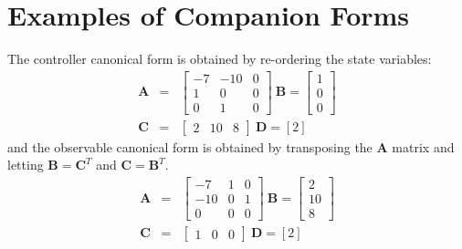 \begin{slide}
\label{slide:l5s} 
\end{slide}

\section*{Examples of Companion Forms}
\ifslidesonly
\begin{slide}

\end{slide}
\fi

The controller canonical form is obtained by re-ordering the state
variables:
\begin{eqnarray*}\mathbf{A} & = & \left[\begin{array}{ccc}
  -7 & -10 & 0 \\
  1 & 0 & 0 \\
  0 & 1 & 0
\end{array}\right]\ \mathbf{B}=\left[\begin{array}{c}
  1 \\
  0 \\
  0
\end{array}\right]\\ \mathbf{C} & = & \left[\begin{array}{ccc}
  2 & 10 & 8
\end{array}\right]\ \mathbf{D}=\left[2\right]\end{eqnarray*}
and the observable canonical form is obtained by transposing the
$\mathbf{A}$ matrix and letting $\mathbf{B} = \mathbf{C}^T$ and
$\mathbf{C}=\mathbf{B}^T$.
\begin{eqnarray*}\mathbf{A} & = & \left[\begin{array}{ccc}
  -7 & 1 & 0 \\
  -10 & 0 & 1 \\
  0 & 0 & 0
\end{array}\right]\ \mathbf{B}=\left[\begin{array}{c}
  2 \\
  10 \\
  8
\end{array}\right]\\ \mathbf{C} & = & \left[\begin{array}{ccc}
  1 & 0 & 0
\end{array}\right]\ \mathbf{D}=\left[2\right]\end{eqnarray*}
